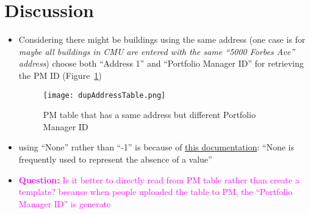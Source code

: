 \documentclass[12pt]{article}
\newcommand{\question}[1]{\textcolor{magenta}{\textbf{Question: } {#1}}}
\newcommand{\fref}[1]{Figure~\ref{#1}}
\begin{document}
\pagebreak
\section{Discussion}
\begin{itemize}
\item Considering there might be buildings using the same address (one
  case is for \emph{maybe all buildings in CMU are entered with the
    same ``5000 Forbes Ave'' address}) choose both ``Address 1'' and
    ``Portfolio Manager ID'' for retrieving the PM ID
    (\fref{fig:dupAddressTable})
  \begin{figure}[h!]
    \centering
    \texttt{[image: dupAddressTable.png]}
    \caption{PM table that has a same address but different Portfolio
      Manager ID}
    \label{fig:dupAddressTable}
  \end{figure}
\item using ``None'' rather than ``-1'' is because of
\href{https://docs.python.org/2/library/constants.html#None}{this
  documentation}: ``None is frequently used to represent the absence
of a value''
\item \question{Is it better to directly read from PM table rather
    than create a template? because when people uploaded the table to
    PM, the ``Portfolio Manager ID'' is generate}
\end{itemize}

\newpage


\end{document}
